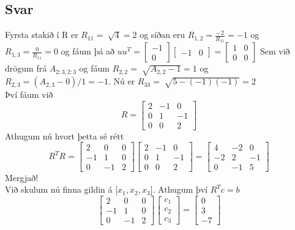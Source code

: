 \documentclass[11pt]{article}
\begin{document}
\subsection*{Svar}
Fyrsta stakið í R er $R_{11} = \sqrt[]{4} = 2$ og síðan eru $R_{1,2} = \frac{-2}{R_{11}} = -1$ og $R_{1,3} = \frac{0}{R_{11}} = 0$
og fáum þá að 
$uu^T = 
\begin{bmatrix}
-1\\
0
\end{bmatrix}
\begin{bmatrix}
-1 & 0
\end{bmatrix}
=
\begin{bmatrix}
1 & 0\\
0 & 0
\end{bmatrix}
$
 Sem við drögum frá $A_{2:3,2:3}$ og fáum 
 $R_{2,2} = \sqrt[]{A_{2,2} - 1} = 1$ og $R_{2,3} = (A_{2,3} - 0)/1 = -1$.
 Nú er $R_{33} = \sqrt[]{5-(-1)(-1)} = 2$\\
Því fáum við 
$$
R=
\begin{bmatrix}
2 & -1 & 0\\
0 & 1 & -1\\
0 & 0 & 2
\end{bmatrix}
$$
Athugum nú hvort þetta sé rétt
$$
R^TR = 
\begin{bmatrix}
2 & 0 & 0\\
-1& 1 & 0\\
0 & -1& 2
\end{bmatrix}
\begin{bmatrix}
2 & -1 & 0\\
0 & 1 & -1\\
0 & 0 & 2
\end{bmatrix}
=
\begin{bmatrix}
4 & -2 & 0\\
-2 & 2 & -1\\
0 & -1 & 5
\end{bmatrix}
$$
Mergjað!\\
Við skulum nú finna gildin á [$x_1, x_2, x_3$]. Athugum því $R^Tc = b$
$$
\begin{bmatrix}
2 & 0 & 0\\
-1& 1 & 0\\
0 &-1 & 2
\end{bmatrix}
\begin{bmatrix}
c_1\\
c_2\\
c_3
\end{bmatrix}
=
\begin{bmatrix}
0\\
3\\
-7
\end{bmatrix}
$$
\end{document}
